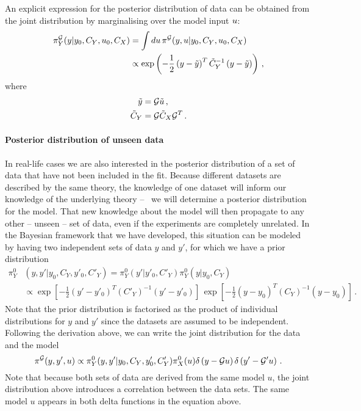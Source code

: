 An explicit expression for the posterior distribution of data can be obtained
from the joint distribution by marginalising over the model input $u$:
\begin{align}
  \label{eq:PosteriorDataSpace}
  \pi_{Y}^{\mathcal{G}}(y|y_0,C_{Y},u_0,C_X)
  &= \int du\, 
  \pi^{\mathcal{G}}(y,u|y_0,C_{Y},u_0,C_X) \\
  &\propto \exp\left(
    -\frac12 \left(y - \tilde{y}\right)^T \tilde{C}_Y^{-1}
    \left(y - \tilde{y}\right)
  \right)\, ,
\end{align}
where
\begin{align}
  \label{eq:PosteriorDataParamsMean}
  \tilde{y} &= \mathcal{G} \tilde{u}\, , \\
  \label{eq:PosteriorDataParamsCov}
  \tilde{C}_Y &= \mathcal{G} \tilde{C}_X \mathcal{G}^T\, .
\end{align}

\paragraph{Posterior distribution of unseen data}

In real-life cases we are also interested in the posterior distribution of a set
of data that have not been included in the fit. Because different datasets are described 
by the same theory, the knowledge of one dataset will inform our knowledge of the underlying 
theory -- \ie\ we will determine a posterior distribution for the model. That new knowledge 
about the model will then propagate to any other -- unseen -- set of data, even if the experiments
are completely unrelated. In the Bayesian framework that
we have developed, this situation can be modeled by having two independent sets
of data $y$ and $y'$, for which we have a prior distribution 
\begin{align}
  \label{eq:JointIndepDataPrior}
  \pi_{Y}^0&\left(y,y'|y_0,C_{Y},y'_0,C'_{Y}\right) 
   = \pi_{Y}^0\left(y'|y'_0,C'_{Y}\right) \pi_{Y}^0\left(y|y_0,C_{Y}\right) \\
  & \propto 
  \exp\left[-\frac12 \left(y'-y'_0\right)^T (C'_{Y})^{-1} 
  \left(y'-y'_0\right)\right]\, 
  \exp\left[-\frac12 \left(y-y_0\right)^T (C_{Y})^{-1} 
  \left(y-y_0\right)\right]\, .
\end{align}
Note that the prior distribution is factorised as the product of individual distributions for $y$ and 
$y'$ since the datasets are assumed to be independent. Following the derivation above, we can write the
joint distribution for the data and the model 
\begin{equation}
  \label{eq:JointModelData}
  \pi^{\mathcal{G}}(y,y',u) 
  \propto 
  \pi_{Y}^0(y,y'|y_0,C_{Y},y'_0,C'_{Y}) 
  \pi_{X}^0(u) 
  \delta\left(y - \mathcal{G}u\right)
  \delta\left(y'- \mathcal{G}'u\right)\, .
\end{equation}
Note that because both sets of data are derived from the same model $u$, the
joint distribution above introduces a correlation between the data sets. The 
same model $u$ appears in both delta functions in the equation above. 

